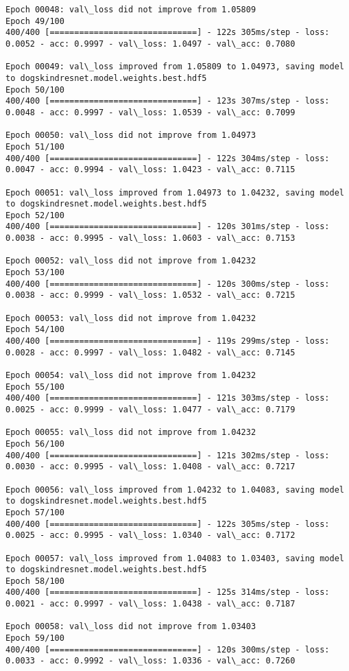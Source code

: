 \documentclass[11pt]{article}
\begin{document}
\begin{Verbatim}[commandchars=\\\{\}]
Epoch 00048: val\_loss did not improve from 1.05809
Epoch 49/100
400/400 [==============================] - 122s 305ms/step - loss: 0.0052 - acc: 0.9997 - val\_loss: 1.0497 - val\_acc: 0.7080

Epoch 00049: val\_loss improved from 1.05809 to 1.04973, saving model to dogskindresnet.model.weights.best.hdf5
Epoch 50/100
400/400 [==============================] - 123s 307ms/step - loss: 0.0048 - acc: 0.9997 - val\_loss: 1.0539 - val\_acc: 0.7099

Epoch 00050: val\_loss did not improve from 1.04973
Epoch 51/100
400/400 [==============================] - 122s 304ms/step - loss: 0.0047 - acc: 0.9994 - val\_loss: 1.0423 - val\_acc: 0.7115

Epoch 00051: val\_loss improved from 1.04973 to 1.04232, saving model to dogskindresnet.model.weights.best.hdf5
Epoch 52/100
400/400 [==============================] - 120s 301ms/step - loss: 0.0038 - acc: 0.9995 - val\_loss: 1.0603 - val\_acc: 0.7153

Epoch 00052: val\_loss did not improve from 1.04232
Epoch 53/100
400/400 [==============================] - 120s 300ms/step - loss: 0.0038 - acc: 0.9999 - val\_loss: 1.0532 - val\_acc: 0.7215

Epoch 00053: val\_loss did not improve from 1.04232
Epoch 54/100
400/400 [==============================] - 119s 299ms/step - loss: 0.0028 - acc: 0.9997 - val\_loss: 1.0482 - val\_acc: 0.7145

Epoch 00054: val\_loss did not improve from 1.04232
Epoch 55/100
400/400 [==============================] - 121s 303ms/step - loss: 0.0025 - acc: 0.9999 - val\_loss: 1.0477 - val\_acc: 0.7179

Epoch 00055: val\_loss did not improve from 1.04232
Epoch 56/100
400/400 [==============================] - 121s 302ms/step - loss: 0.0030 - acc: 0.9995 - val\_loss: 1.0408 - val\_acc: 0.7217

Epoch 00056: val\_loss improved from 1.04232 to 1.04083, saving model to dogskindresnet.model.weights.best.hdf5
Epoch 57/100
400/400 [==============================] - 122s 305ms/step - loss: 0.0025 - acc: 0.9995 - val\_loss: 1.0340 - val\_acc: 0.7172

Epoch 00057: val\_loss improved from 1.04083 to 1.03403, saving model to dogskindresnet.model.weights.best.hdf5
Epoch 58/100
400/400 [==============================] - 125s 314ms/step - loss: 0.0021 - acc: 0.9997 - val\_loss: 1.0438 - val\_acc: 0.7187

Epoch 00058: val\_loss did not improve from 1.03403
Epoch 59/100
400/400 [==============================] - 120s 300ms/step - loss: 0.0033 - acc: 0.9992 - val\_loss: 1.0336 - val\_acc: 0.7260


\end{Verbatim}
\end{document}

